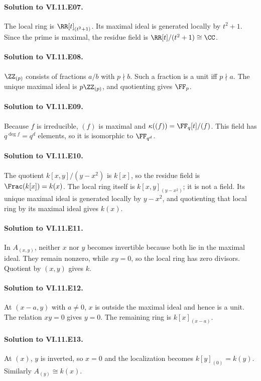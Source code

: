 \paragraph{Solution to VI.11.E07.}
The local ring is $\RR[t]_{(t^2+1)}$.  Its maximal ideal is generated locally by $t^2+1$.  Since the prime is maximal, the residue field is $\RR[t]/(t^2+1)\cong\CC$.

\paragraph{Solution to VI.11.E08.}
$\ZZ_{(p)}$ consists of fractions $a/b$ with $p\nmid b$.  Such a fraction is a unit iff $p\nmid a$.  The unique maximal ideal is $p\ZZ_{(p)}$, and quotienting gives $\FF_p$.

\paragraph{Solution to VI.11.E09.}
Because $f$ is irreducible, $(f)$ is maximal and $\kappa((f))=\FF_q[t]/(f)$.  This field has $q^{\deg f}=q^d$ elements, so it is isomorphic to $\FF_{q^d}$.

\paragraph{Solution to VI.11.E10.}
The quotient $k[x,y]/(y-x^2)$ is $k[x]$, so the residue field is $\Frac(k[x])=k(x)$.  The local ring itself is $k[x,y]_{(y-x^2)}$; it is not a field.  Its unique maximal ideal is generated locally by $y-x^2$, and quotienting that local ring by its maximal ideal gives $k(x)$.

\paragraph{Solution to VI.11.E11.}
In $A_{(x,y)}$, neither $x$ nor $y$ becomes invertible because both lie in the maximal ideal.  They remain nonzero, while $xy=0$, so the local ring has zero divisors.  Quotient by $(x,y)$ gives $k$.

\paragraph{Solution to VI.11.E12.}
At $(x-a,y)$ with $a\neq0$, $x$ is outside the maximal ideal and hence is a unit.  The relation $xy=0$ gives $y=0$.  The remaining ring is $k[x]_{(x-a)}$.

\paragraph{Solution to VI.11.E13.}
At $(x)$, $y$ is inverted, so $x=0$ and the localization becomes $k[y]_{(0)}=k(y)$.  Similarly $A_{(y)}\cong k(x)$.

